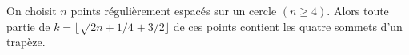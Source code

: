 On choisit $n$ points régulièrement espacés sur un cercle $(n \geq 4)$. Alors toute partie de $k = \lfloor \sqrt{2n + 1/4} + 3/2 \rfloor$ de ces points contient les quatre sommets d'un trapèze.
